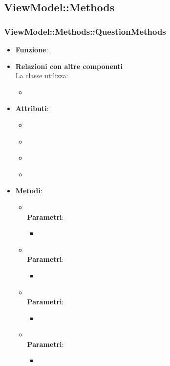 \subsection{ViewModel::Methods}
\subsubsection{ViewModel::Methods::QuestionMethods}
\begin{itemize}
\item\textbf{Funzione}:
\item\textbf{Relazioni con altre componenti}\\
La classe utilizza:
	\begin{itemize}
		\item
	\end{itemize}
\item\textbf{Attributi}:
	\begin{itemize}
		\item\code{}\\
		\item\code{}\\
		\item\code{}\\
		\item\code{}\\
	\end{itemize}
\item\textbf{Metodi}:
	\begin{itemize}
		\item\code{}\\
		\textbf{Parametri}:
			\begin{itemize}
				\item\code{}\\
			\end{itemize}
		\item\code{}\\
		\textbf{Parametri}:
			\begin{itemize}
				\item\code{}\\
			\end{itemize}
		\item\code{}\\
		\textbf{Parametri}:
			\begin{itemize}
				\item\code{}\\
			\end{itemize}
		\item\code{}\\
		\textbf{Parametri}:
			\begin{itemize}
				\item\code{}\\
			\end{itemize}
	\end{itemize}
\end{itemize}

